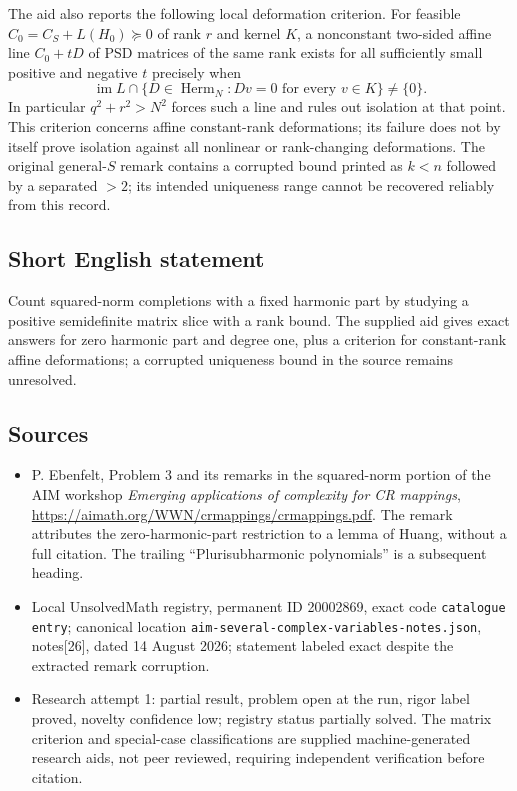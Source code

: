 \documentclass[11pt]{article}
\begin{document}
The aid also reports the following local deformation criterion. For feasible \(C_0=C_S+L(H_0)\succeq0\) of rank \(r\) and kernel \(K\), a nonconstant two-sided affine line \(C_0+tD\) of PSD matrices of the same rank exists for all sufficiently small positive and negative \(t\) precisely when
\[
\operatorname{im}L\cap\{D\in\operatorname{Herm}_N:Dv=0\text{ for every }v\in K\}\ne\{0\}.
\]
In particular \(q^2+r^2>N^2\) forces such a line and rules out isolation at that point. This criterion concerns affine constant-rank deformations; its failure does not by itself prove isolation against all nonlinear or rank-changing deformations. The original general-\(S\) remark contains a corrupted bound printed as \(k<n\) followed by a separated \(>2\); its intended uniqueness range cannot be recovered reliably from this record.
\subsection{Short English statement}
Count squared-norm completions with a fixed harmonic part by studying a positive semidefinite matrix slice with a rank bound. The supplied aid gives exact answers for zero harmonic part and degree one, plus a criterion for constant-rank affine deformations; a corrupted uniqueness bound in the source remains unresolved.
\subsection{Sources}
\begin{itemize}
\item P. Ebenfelt, Problem 3 and its remarks in the squared-norm portion of the AIM workshop \emph{Emerging applications of complexity for CR mappings}, \url{https://aimath.org/WWN/crmappings/crmappings.pdf}. The remark attributes the zero-harmonic-part restriction to a lemma of Huang, without a full citation. The trailing ``Plurisubharmonic polynomials'' is a subsequent heading.
\item Local UnsolvedMath registry, permanent ID 20002869, exact code \texttt{catalogue entry}; canonical location \texttt{aim-several-complex-variables-notes.json}, notes[26], dated 14 August 2026; statement labeled exact despite the extracted remark corruption.
\item Research attempt 1: partial result, problem open at the run, rigor label proved, novelty confidence low; registry status partially solved. The matrix criterion and special-case classifications are supplied machine-generated research aids, not peer reviewed, requiring independent verification before citation.
\end{itemize}
\end{document}
